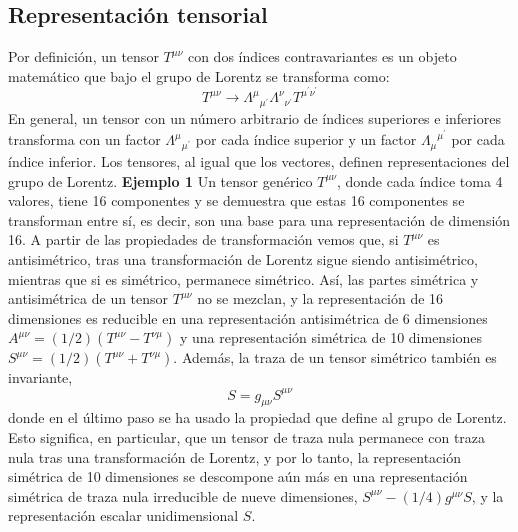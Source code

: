 \documentclass[a4paper,11pt]{book} %
\begin{document}
\subsection{Representación tensorial}
\noindent
Por definición, un tensor $T^{\mu\nu}$ con dos índices contravariantes es un objeto matemático que bajo el grupo de Lorentz se transforma como:
\begin{equation}
T^{\mu\nu}\rightarrow{\Lambda^{\mu}}_{\mu^{\prime}}{\Lambda^{\nu}}_{\nu^{\prime}}T^{\mu^{\prime}\nu^{\prime}}
\end{equation}
\noindent
En general, un tensor con un número arbitrario de índices superiores e inferiores transforma con un factor ${\Lambda^{\mu}}_{\mu^{\prime}}$ por cada índice superior y un factor ${\Lambda_{\mu}}^{\mu^{\prime}}$ por cada índice inferior.
\medskip\newline
Los tensores, al igual que los vectores, definen representaciones del grupo de Lorentz. 
\medskip\newline
\textbf{Ejemplo 1} 
\medskip\newline\noindent
Un tensor genérico $T^{\mu\nu}$, donde cada índice toma 4 valores, tiene 16 componentes y se demuestra que estas 16 componentes se transforman entre sí, es decir, son una base para una representación de dimensión 16.
\medskip\newline
A partir de las propiedades de transformación vemos que, si $T^{\mu\nu}$ es antisimétrico, tras una transformación de Lorentz sigue siendo antisimétrico, mientras que si es simétrico, permanece simétrico. Así, las partes simétrica y antisimétrica de un tensor $T^{\mu\nu}$ no se mezclan, y la representación de 16 dimensiones es reducible en una representación antisimétrica de 6 dimensiones $A^{\mu\nu}=(1/2)(T^{\mu\nu}-T^{\nu\mu})$ y una representación simétrica de 10 dimensiones $S^{\mu\nu}=(1/2)(T^{\mu\nu}+T^{\nu\mu})$.
\medskip\newline
Además, la traza de un tensor simétrico también es invariante,
\begin{equation}
S = g_{\mu\nu}S^{\mu\nu}
\end{equation}
donde en el último paso se ha usado la propiedad que define al grupo de Lorentz. Esto significa, en particular, que un tensor de traza nula permanece con traza nula tras una transformación de Lorentz, y por lo tanto, la representación simétrica de 10 dimensiones se descompone aún más en una representación simétrica de traza nula irreducible de nueve dimensiones, $S^{\mu\nu}-(1/4)g^{\mu\nu}S$, y la representación escalar unidimensional $S$.
\end{document}
